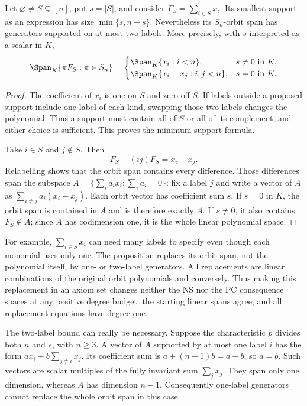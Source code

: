 \begin{proposition}\label{tx:prop:linear-compression}
Let $\varnothing\ne S\subsetneq[n]$, put $s=|S|$, and consider
$F_S=\sum_{i\in S}x_i$. Its smallest support as an expression has size
$\min\{s,n-s\}$. Nevertheless its $S_n$-orbit span has generators
supported on at most two labels. More precisely, with $s$ interpreted
as a scalar in $K$,
\[
 \Span_K\{\pi F_S:\pi\in S_n\}=
 \begin{cases}
     \Span_K\{x_i:i<n\},&s\ne0\text{ in }K,\\
     \Span_K\{x_i-x_j:i,j<n\},&s=0\text{ in }K.
 \end{cases}
\]
\end{proposition}
\begin{proof}
The coefficient of $x_i$ is one on $S$ and zero off $S$. If labels
outside a proposed support include one label of each kind, swapping
those two labels changes the polynomial. Thus a support must contain
all of $S$ or all of its complement, and either choice is sufficient.
This proves the minimum-support formula.

Take $i\in S$ and $j\notin S$. Then
\[
                       F_S-(ij)F_S=x_i-x_j.
\]
Relabelling shows that the orbit span contains every difference.
Those differences span the subspace
$A=\{\sum_i a_ix_i:\sum_i a_i=0\}$: fix a label $j$ and write a
vector of $A$ as $\sum_{i\ne j}a_i(x_i-x_j)$.
Each orbit vector has coefficient sum $s$. If $s=0$ in $K$, the
orbit span is contained in $A$ and is therefore exactly $A$. If
$s\ne0$, it also contains $F_S\notin A$; since $A$ has codimension
one, it is the whole linear polynomial space.
\end{proof}

For example, $\sum_{i\in S}x_i$ can need many labels to specify even
though each monomial uses only one. The proposition replaces its orbit
span, not the polynomial itself, by one- or two-label generators.
All replacements are linear combinations of the original orbit
polynomials and conversely. Thus making this replacement in an axiom
set changes neither the NS nor the PC consequence spaces at any
positive degree budget: the starting linear spans agree, and all
replacement equations have degree one.

The two-label bound can really be necessary. Suppose the characteristic
$p$ divides both $n$ and $s$, with $n\ge3$. A vector of $A$ supported
by at most one label $i$ has the form
$a x_i+b\sum_{j\ne i}x_j$. Its coefficient sum is
$a+(n-1)b=a-b$, so $a=b$. Such vectors are scalar multiples of the
fully invariant sum $\sum_jx_j$. They span only one dimension, whereas
$A$ has dimension $n-1$. Consequently one-label generators cannot
replace the whole orbit span in this case.

